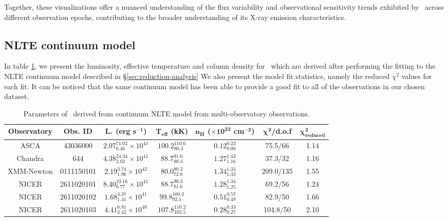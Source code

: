     Together, these visualizations offer a nuanced understanding of the flux variability and observational sensitivity trends exhibited by \source\ across different observation epochs, contributing to the broader understanding of its X-ray emission characteristics.
    
    \subsection{NLTE continuum model}
    In table \ref{tab:res-fitting}, we present the luminosity, effective temperature and column density for \source\ which are derived after performing the fitting to the NLTE continuum model described in \S \ref{sec:reduction-analysis} We also present the model fit statistics, namely the reduced $\chi^2$ values for each fit. It can be noticed that the same continuum model has been able to provide a good fit to all of the observations in our chosen dataset.
    \begin{table}[!htb]
    	\centering
    	\caption{Parameters of \source\ derived from continuum NLTE model from multi-observatory observations.}
    	\label{tab:res-fitting}
    	\begin{tabular}{ccccccc}
			\hline
			{\textbf{Observatory}} & {\textbf{Obs. ID}} & {$\boldsymbol{L_*}$ \textbf{(erg s$\boldsymbol{^{-1}}$)}} & {\textbf{$\boldsymbol{T_\text{eff}}$ (kK)}} & {\textbf{$\boldsymbol{n_H}$ ($\boldsymbol{\times 10^{22}}$ cm$\boldsymbol{^{-2}}$)}} & {$\boldsymbol{\chi^2}$/\textbf{d.o.f}} & {$\boldsymbol{\chi^2_\text{reduced}}$} \\
			\hline
			{ASCA} & {43036000} & {$2.07_{0.46}^{71.02}\times 10^{41}$} & {$100.2_{80.3}^{110.6}$} & {$0.12_{0.00}^{0.23}$} & {75.5/66} & {1.14} \\
			{Chandra} & {644} & {$4.38_{2.02}^{24.34}\times 10^{41}$} & {$88.7_{80.3}^{91.6}$} & {$1.27_{1.16}^{1.43}$} & {37.3/32} & {1.16} \\
			{XMM-Newton} & {0111150101} & {$2.19_{1.96}^{3.74}\times 10^{42}$} & {$80.0_{72.8}^{80.2}$} & {$1.34_{1.33}^{1.34}$} & {209.0/135} & {1.55} \\
			{NICER} & {2611020101} & {$8.40_{6.77}^{19.16}\times 10^{41}$} & {$88.7_{81.6}^{90.3}$} & {$1.28_{1.25}^{1.34}$} & {69.2/56} & {1.24} \\
			{NICER} & {2611020102} & {$1.68_{1.41}^{3.37}\times 10^{41}$} & {$99.8_{92.1}^{100.3}$} & {$0.51_{0.49}^{0.57}$} & {82.9/50} & {1.66} \\
			{NICER} & {2611020103} & {$4.41_{3.42}^{6.81}\times 10^{40}$} & {$107.8_{102.5}^{110.2}$} & {$0.28_{0.27}^{0.33}$} & {104.8/50} & {2.10} \\
			\hline
		\end{tabular}
	\end{table}
    
